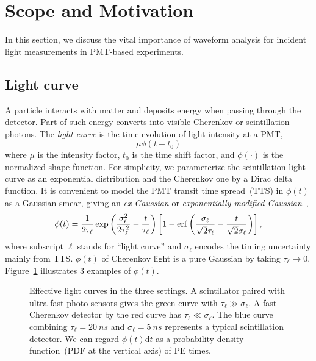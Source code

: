 \section{Scope and Motivation}
\label{sec:toyMC}

In this section, we discuss the vital importance of waveform analysis for incident light measurements in PMT-based experiments.

\subsection{Light curve}
A particle interacts with matter and deposits energy when passing through the detector. Part of such energy converts into visible Cherenkov or scintillation photons. The \textit{light curve} is the time evolution of light intensity at a PMT,
\begin{equation}
  \label{eq:light-curve}
  \mu\phi(t-t_0)
\end{equation}
where $\mu$ is the intensity factor, $t_0$ is the time shift factor, and $\phi(\cdot)$ is the normalized shape function. For simplicity, we parameterize the scintillation light curve as an exponential distribution and the Cherenkov one by a Dirac delta function.  It is convenient to model the PMT transit time spread~(TTS) in $\phi(t)$ as a Gaussian smear, giving an \textit{ex-Gaussian} or \textit{exponentially modified Gaussian}~\cite{li_separation_2016},
\begin{align}
    \phi(t) = \frac{1}{2\tau_\ell} \exp\left(\frac{\sigma_\ell^2}{2\tau_\ell^2}-\frac{t}{\tau_\ell}\right) \left[1 - \operatorname{erf}\left( \frac{\sigma_\ell}{\sqrt{2}\tau_\ell} - \frac{t}{\sqrt{2}\sigma_\ell} \right)\right],
    \label{eq:time-pro}
\end{align}
where subscript $\ell$ stands for ``light curve'' and $\sigma_\ell$ encodes the timing uncertainty mainly from TTS. $\phi(t)$ of Cherenkov light is a pure Gaussian by taking $\tau_\ell \rightarrow 0$. Figure~\ref{fig:time-pro} illustrates 3 examples of $\phi(t)$. 

\begin{figure}[!htb]
  \centering
  \resizebox{0.5\textwidth}{!}{}
  \caption{\label{fig:time-pro} Effective light curves in the three settings.  A scintillator paired with ultra-fast photo-sensors gives the green curve with $\tau_\ell \gg \sigma_\ell$.  A fast Cherenkov detector by the red curve has $\tau_\ell \ll \sigma_\ell$.  The blue curve combining $\tau_\ell=\SI{20}{ns}$ and $\sigma_\ell=\SI{5}{ns}$ represents a typical scintillation detector.  We can regard $\phi(t)\mathrm{d}t$ as a probability density function~(PDF at the vertical axis) of PE times.}
\end{figure}


